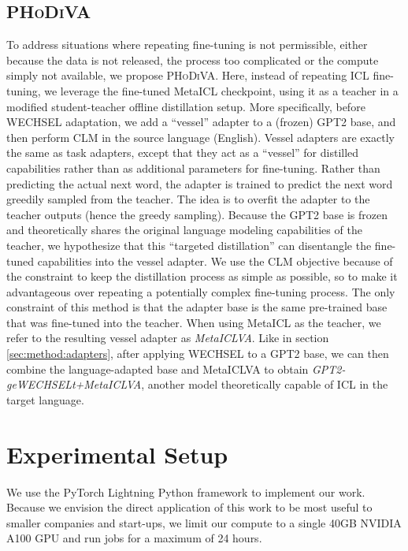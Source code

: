 \documentclass[11pt]{article}
\begin{document}
\subsection{\textsc{PHoDiVA}}

To address situations where repeating fine-tuning is not permissible, either because the data is not
released, the process too complicated or the compute simply not available, we propose
\textsc{PHoDiVA}. Here, instead of repeating ICL fine-tuning, we leverage the fine-tuned MetaICL
checkpoint, using it as a teacher in a modified student-teacher offline distillation
\citep{hinton_distilling_2015} setup. More specifically, before WECHSEL adaptation, we add
a ``vessel'' adapter to a (frozen) GPT2 base, and then perform CLM in the source language (English).
Vessel adapters are exactly the same as task adapters, except that they act as a ``vessel'' for
distilled capabilities rather than as additional parameters for fine-tuning. Rather than predicting
the actual next word, the adapter is trained to predict the next word greedily sampled from the
teacher. The idea is to overfit the adapter to the teacher outputs (hence the greedy sampling).
Because the GPT2 base is frozen and theoretically shares the original language modeling capabilities
of the teacher, we hypothesize that this ``targeted distillation'' can disentangle the fine-tuned
capabilities into the vessel adapter. We use the CLM objective because of the constraint to keep the
distillation process as simple as possible, so to make it advantageous over repeating a potentially
complex fine-tuning process. The only constraint of this method is that the adapter base is the same
pre-trained base that was fine-tuned into the teacher. When using MetaICL as the teacher, we refer to
the resulting vessel adapter as \textit{MetaICLVA}. Like in section \ref{sec:method:adapters}, after
applying WECHSEL to a GPT2 base, we can then combine the language-adapted base and MetaICLVA to
obtain \textit{GPT2-geWECHSELt+MetaICLVA}, another model theoretically capable of ICL in the target
language.

\section{Experimental Setup}

We use the PyTorch Lightning Python framework \citep{falcon_pytorch_2019} to implement our work.
Because we envision the direct application of this work to be most useful to smaller companies and
start-ups, we limit our compute to a single 40GB NVIDIA A100 GPU and run jobs for a maximum of 24
hours.
\end{document}
